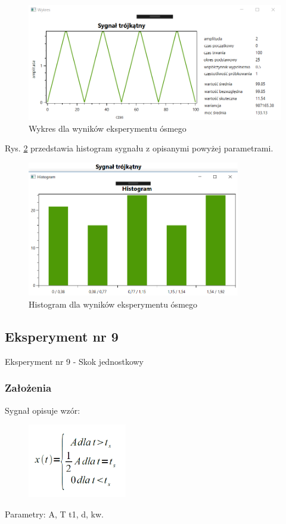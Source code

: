\documentclass[12pt]{article}
\begin{document}
\begin{figure}[h!]
 \centering
 \includegraphics[width=12.3cm]{SygTroj.PNG}
 \vspace{-0.3cm}
 \caption{Wykres dla wyników eksperymentu ósmego}
 \label{Wykres dla wyników eksperymentu ósmego}
\end{figure}
\newpage
Rys. \ref{Histogram dla wyników eksperymentu ósmego} przedstawia histogram sygnału z opisanymi powyżej parametrami. 
\begin{figure}[h!]
 \centering
 \includegraphics[width=9.3cm]{SygTrojHist.PNG}
 \vspace{-0.3cm}
 \caption{Histogram dla wyników eksperymentu ósmego}
 \label{Histogram dla wyników eksperymentu ósmego}
\end{figure}

\subsection{Eksperyment nr 9}

Eksperyment nr 9 - Skok jednostkowy

\subsubsection{Założenia}
Sygnał opisuje wzór:
\begin{figure}[h!]
 \centering
 \includegraphics[width=4.3cm]{SkowJWzor.PNG}
 \vspace{-0.3cm}
 \label{gw}
\end{figure}
\newpage
Parametry: A, T t1, d, kw.
\end{document}
